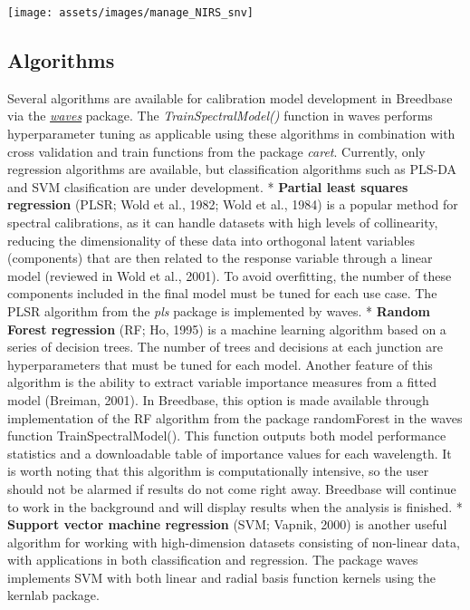\documentclass[
  12pt,
]{book}
\begin{document}
\begin{center}\texttt{[image: assets/images/manage\_NIRS\_snv]} \end{center}

\hypertarget{algorithms}{%
\subsection{Algorithms}\label{algorithms}}

Several algorithms are available for calibration model development in Breedbase via the \href{https://CRAN.R-project.org/package=waves}{\emph{waves}} package. The \emph{TrainSpectralModel()} function in waves performs hyperparameter tuning as applicable using these algorithms in combination with cross validation and train functions from the package \emph{caret}. Currently, only regression algorithms are available, but classification algorithms such as PLS-DA and SVM clasification are under development. * \textbf{Partial least squares regression} (PLSR; Wold et al., 1982; Wold et al., 1984) is a popular method for spectral calibrations, as it can handle datasets with high levels of collinearity, reducing the dimensionality of these data into orthogonal latent variables (components) that are then related to the response variable through a linear model (reviewed in Wold et al., 2001). To avoid overfitting, the number of these components included in the final model must be tuned for each use case. The PLSR algorithm from the \emph{pls} package is implemented by waves. * \textbf{Random Forest regression} (RF; Ho, 1995) is a machine learning algorithm based on a series of decision trees. The number of trees and decisions at each junction are hyperparameters that must be tuned for each model. Another feature of this algorithm is the ability to extract variable importance measures from a fitted model (Breiman, 2001). In Breedbase, this option is made available through implementation of the RF algorithm from the package randomForest in the waves function TrainSpectralModel(). This function outputs both model performance statistics and a downloadable table of importance values for each wavelength. It is worth noting that this algorithm is computationally intensive, so the user should not be alarmed if results do not come right away. Breedbase will continue to work in the background and will display results when the analysis is finished. * \textbf{Support vector machine regression} (SVM; Vapnik, 2000) is another useful algorithm for working with high-dimension datasets consisting of non-linear data, with applications in both classification and regression. The package waves implements SVM with both linear and radial basis function kernels using the kernlab package.
\end{document}
